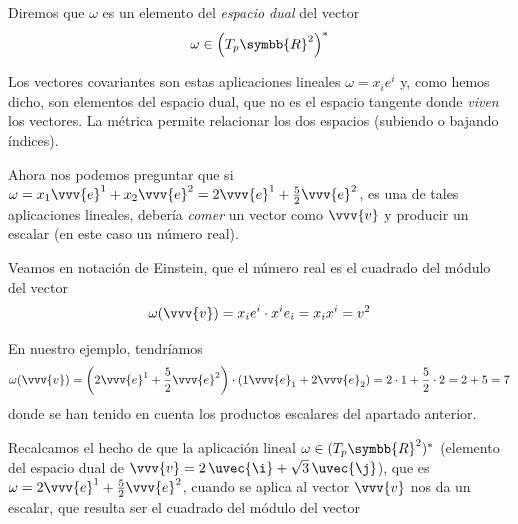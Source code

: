 Diremos que $\omega$ es un elemento del \emph{espacio dual} del vector
\[
  \omega \in \left(T_p\symbb{R}^2\right)^*
\]

Los vectores covariantes son estas aplicaciones lineales $\omega = x_ie^i$ y, como hemos
dicho, son elementos del espacio dual, que no es el espacio tangente donde \emph{viven}
los vectores. La métrica permite relacionar los dos espacios (subiendo o bajando índices).

Ahora nos podemos preguntar que si
$\omega = x_1\vvv{e}^1 + x_2\vvv{e}^2 = 2\vvv{e}^1 + \frac{5}{2}\vvv{e}^2$, es una de
tales aplicaciones lineales, debería \emph{comer} un vector como $\vvv{v}$ y producir un
escalar (en este caso un número real).

Veamos en notación de Einstein, que el número real es el cuadrado del módulo del vector
\[
  \omega(\vvv{v}) = x_ie^i\cdot x^ie_i = x_ix^i = v^2
\]

En nuestro ejemplo, tendríamos
\[
  \omega(\vvv{v})
  = \left(2\vvv{e}^1+\dfrac{5}{2}\vvv{e}^2\right)\cdot\left(1\vvv{e}_1+2\vvv{e}_2\right)
  = 2\cdot 1 + \dfrac{5}{2}\cdot 2
  = 2 + 5
  = 7
\]
donde se han tenido en cuenta los productos escalares del apartado anterior.

Recalcamos el hecho de que la aplicación lineal $\omega\in (T_p\symbb{R}^2)^*$
(elemento del espacio dual de $\vvv{v} = 2\,\uvec{\i}+\sqrt{3}\,\uvec{\j}$), que es
$\omega=2\vvv{e}^1+\frac{5}{2}\vvv{e}^2$, cuando se aplica al vector $\vvv{v}$ nos da un
escalar, que resulta ser el cuadrado del módulo del vector



